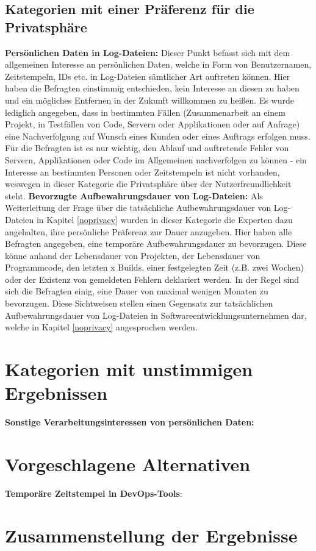 \subsection{Kategorien mit einer Präferenz für die Privatsphäre} \label{privacy}
\textbf{Persönlichen Daten in Log-Dateien:} \newline
Dieser Punkt befasst sich mit dem allgemeinen Interesse an persönlichen Daten, welche in Form von Benutzernamen, Zeitstempeln, IDs etc. in Log-Dateien sämtlicher Art auftreten können. Hier haben die Befragten einstimmig
entschieden, kein Interesse an diesen zu haben und ein mögliches Entfernen in der Zukunft willkommen zu heißen. Es wurde lediglich angegeben, dass in bestimmten Fällen (Zusammenarbeit an einem Projekt, 
in Testfällen von Code, Servern oder Applikationen oder auf Anfrage) eine Nachverfolgung auf Wunsch eines Kunden oder eines Auftrags erfolgen muss. Für die Befragten ist es nur wichtig, den Ablauf und auftretende Fehler 
von Servern, Applikationen oder Code im Allgemeinen nachverfolgen zu können - ein Interesse an bestimmten Personen oder Zeitstempeln ist nicht vorhanden, weswegen in dieser Kategorie die Privatsphäre über der Nutzerfreundlichkeit
steht. \newline \newline
\textbf{Bevorzugte Aufbewahrungsdauer von Log-Dateien:} \newline
Als Weiterleitung der Frage über die tatsächliche Aufbewahrungsdauer von Log-Dateien in Kapitel \ref{noprivacy} wurden in dieser Kategorie die Experten dazu angehalten, ihre persönliche Präferenz zur Dauer anzugeben. Hier haben alle 
Befragten angegeben, eine temporäre Aufbewahrungsdauer zu bevorzugen. Diese könne anhand der Lebensdauer von Projekten, der Lebensdauer von Programmcode, den letzten x Builds, einer festgelegten Zeit (z.B. zwei Wochen)
oder der Existenz von gemeldeten Fehlern deklariert werden. In der Regel sind sich die Befragten einig, eine Dauer von maximal wenigen Monaten zu bevorzugen. Diese Sichtweisen stellen einen Gegensatz zur tatsächlichen Aufbewahrungsdauer von
Log-Dateien in Softwareentwicklungsunternehmen dar, welche in Kapitel \ref{noprivacy} angesprochen werden.

\section{Kategorien mit unstimmigen Ergebnissen} \label{noclearresult}
\textbf{Sonstige Verarbeitungsinteressen von persönlichen Daten:} \\

\section{Vorgeschlagene Alternativen}
\textbf{Temporäre Zeitstempel in DevOps-Tools}: \newline

\section{Zusammenstellung der Ergebnisse}




